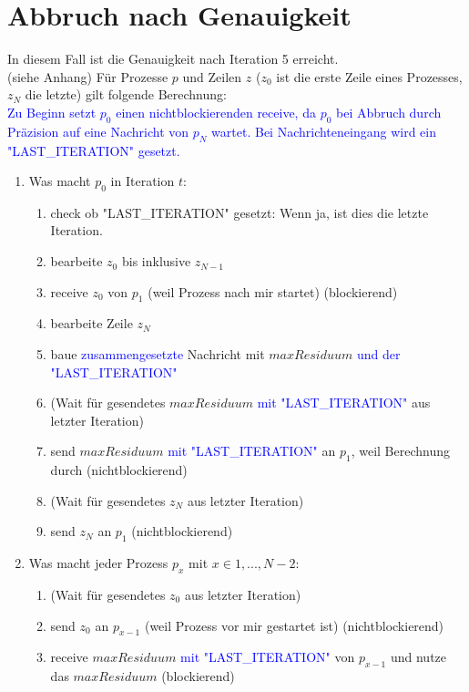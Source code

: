 \documentclass[a4paper,10pt,landscape]{article}
\begin{document}
\section*{Abbruch nach Genauigkeit}
In diesem Fall ist die Genauigkeit nach Iteration 5 erreicht.\\
(siehe Anhang)
\newpage
Für Prozesse $p$ und Zeilen $z$ ($z_0$ ist die erste Zeile eines Prozesses, $z_N$ die letzte) gilt folgende Berechnung:\\
\textcolor{blue}{Zu Beginn setzt $p_0$ einen nichtblockierenden receive, da $p_0$ bei Abbruch durch Präzision auf eine Nachricht von $p_N$ wartet. Bei Nachrichteneingang wird ein "LAST\_ITERATION" gesetzt.}\\
\begin{enumerate}
    \item Was macht $p_0$ in Iteration $t$:
    \begin{enumerate}
        \color{blue}
        \item check ob "LAST\_ITERATION" gesetzt: Wenn ja, ist dies die letzte Iteration.
        \color{black}
        \item bearbeite $z_0$ bis inklusive $z_{N-1}$
        \item receive $z_0$ von $p_1$ (weil Prozess nach mir startet) (blockierend)
        \item bearbeite Zeile $z_N$
        \item baue \textcolor{blue}{zusammengesetzte} Nachricht mit $maxResiduum$ \textcolor{blue}{und der "LAST\_ITERATION"}
        \item (Wait für gesendetes $maxResiduum$ \textcolor{blue}{mit "LAST\_ITERATION"} aus letzter Iteration)
        \item send $maxResiduum$ \textcolor{blue}{mit "LAST\_ITERATION"} an $p_1$, weil Berechnung durch (nichtblockierend)
        \item (Wait für gesendetes $z_N$ aus letzter Iteration)
        \item send $z_N$ an $p_1$ (nichtblockierend)
    \end{enumerate}
    \item Was macht jeder Prozess $p_x$ mit $x \in {1,...,N-2}$:
    \begin{enumerate}
        \item (Wait für gesendetes $z_0$ aus letzter Iteration)
        \item send $z_0$ an $p_{x-1}$ (weil Prozess vor mir gestartet ist) (nichtblockierend)
        \item receive $maxResiduum$ \textcolor{blue}{mit "LAST\_ITERATION"} von $p_{x-1}$ und nutze das $maxResiduum$ (blockierend)

\end{enumerate}
\end{enumerate}
\end{document}
